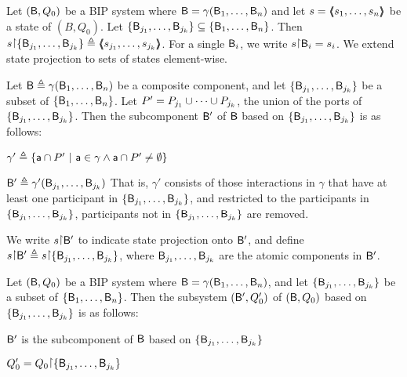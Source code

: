 \ed


\label{def.bip.state.projection} Let $(\mathsf{B}, Q_0)$
be a BIP system where $\mathsf{B} = \gamma(\mathsf{B}_1,\dots,\mathsf{B}_n)$ and let $s =
\langle \hspace{-0.34em} \langle \hspace{-0.34em} \langle s_1,\dots,s_n \rangle \hspace{-0.34em} \rangle \hspace{-0.34em} \rangle$ be a state of $(B, Q_0)$. Let 
$\{ \mathsf{B}_{j_1},\dots,\mathsf{B}_{j_k} \} \subseteq \{ \mathsf{B}_1,\dots,\mathsf{B}_n \}$. Then $s \pj
\set{\B_{j_1},\dots,\B_{j_k}} \df \tpl{s_{j_1},\dots,s_{j_k}}$. For a
single $\mathsf{B}_i$, we write $s \pj \B_i = s_i$.
%
We extend state projection to sets of states element-wise.
\ed


\bd[Subcomponent]\label{def.bip.subcomponent}
Let $\mathsf{B} \triangleq \gamma(\mathsf{B}_1,\dots,\mathsf{B}_n)$ be a composite component, and let 
$\{ \mathsf{B}_{j_1},\dots,\mathsf{B}_{j_k} \}$ be a subset of $\{ \mathsf{B}_{1},\dots,\mathsf{B}_{n} \}$.
Let $P' = P_{j_1} \cup \cdots \cup P_{j_k}$, \ie the union of the ports of $\{ \mathsf{B}_{j_1},\dots,\mathsf{B}_{j_k} \}$.
Then the subcomponent $\mathsf{B}'$ of $\mathsf{B}$ based on $\{ \mathsf{B}_{j_1},\dots,\mathsf{B}_{j_k} \}$ 
is as follows:
\bn
\item $\gamma' \triangleq \{  \mathsf{a} \cap P' ~|~ \mathsf{a} \in \gamma \land \mathsf{a} \cap P' \ne \emptyset \}$
\item $\mathsf{B}' \triangleq \gamma'(\mathsf{B}_{j_1},\dots,\mathsf{B}_{j_k})$ 
\en
\ed
That is, $\gamma'$ consists of those interactions in $\gamma$ that have at least one participant in 
$\{ \mathsf{B}_{j_1},\dots,\mathsf{B}_{j_k} \}$, and restricted to the participants in $\{ \mathsf{B}_{j_1},\dots,\mathsf{B}_{j_k} \}$,
\ie participants not in $\{ \mathsf{B}_{j_1},\dots,\mathsf{B}_{j_k} \}$ are removed.

We write $s \pj \B'$ to indicate state projection onto $\mathsf{B}'$, and define 
$s \pj \B' \df  s \pj \set{\B_{j_1}, \dots, \B_{j_k}}$, where $\mathsf{B}_{j_1},\dots,\mathsf{B}_{j_k}$ are the atomic
components in $\mathsf{B}'$.






\bd[Subsystem]\label{def.bip.subsystem}
Let $(\mathsf{B}, Q_0)$ be a BIP system where $\mathsf{B} = \gamma(\mathsf{B}_1,\dots,\mathsf{B}_n)$, and let 
$\{ \mathsf{B}_{j_1},\dots,\mathsf{B}_{j_k} \}$ be a subset of $\{ \mathsf{B}_{1},\dots,\mathsf{B}_{n} \}$.
Then the subsystem $(\mathsf{B}', Q'_0)$ of  $(\mathsf{B}, Q_0)$ based on $\{ \mathsf{B}_{j_1},\dots,\mathsf{B}_{j_k} \}$ 
is as follows:
\bn
\item $\mathsf{B}'$ is the subcomponent of $\mathsf{B}$ based on $\{ \mathsf{B}_{j_1},\dots,\mathsf{B}_{j_k} \}$ 
\item $Q'_0 = Q_0 \pj \set{\B_{j_1},\dots,\B_{j_k}}$
\en
\ed

